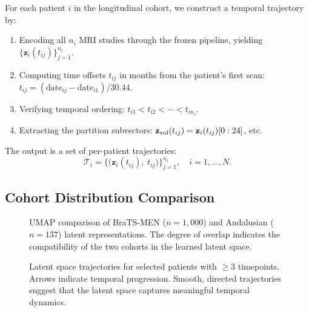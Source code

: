 For each patient $i$ in the longitudinal cohort, we construct a temporal
trajectory by:
\begin{enumerate}[leftmargin=*]
  \item Encoding all $n_i$ MRI studies through the frozen pipeline, yielding
    $\{\mathbf{z}_i(t_{ij})\}_{j=1}^{n_i}$.
  \item Computing time offsets $t_{ij}$ in months from the patient's first
    scan: $t_{ij} = (\text{date}_{ij} - \text{date}_{i1}) / 30.44$.
  \item Verifying temporal ordering: $t_{i1} < t_{i2} < \cdots < t_{in_i}$.
  \item Extracting the partition subvectors:
    $\mathbf{z}_{\text{vol}}(t_{ij}) = \mathbf{z}_i(t_{ij})[0:24]$, etc.
\end{enumerate}

The output is a set of per-patient trajectories:
\begin{equation}
  \mathcal{T}_i = \bigl\{
    \bigl(\mathbf{z}_i(t_{ij}),\; t_{ij}\bigr)
  \bigr\}_{j=1}^{n_i}, \quad i = 1, \ldots, N.
  \label{eq:trajectory}
\end{equation}

\subsection{Cohort Distribution Comparison}
\label{sec:enc:distribution}

\begin{figure}[H]
  \centering
  \caption{UMAP comparison of BraTS-MEN ($n=1{,}000$) and Andalusian
    ($n=137$) latent representations. The degree of overlap indicates
    the compatibility of the two cohorts in the learned latent space.}
  \label{fig:cohort_umap}
\end{figure}

\begin{figure}[H]
  \centering
  \caption{Latent space trajectories for selected patients with $\geq 3$
    timepoints. Arrows indicate temporal progression. Smooth, directed
    trajectories suggest that the latent space captures meaningful temporal
    dynamics.}
  \label{fig:trajectories_umap}
\end{figure}
